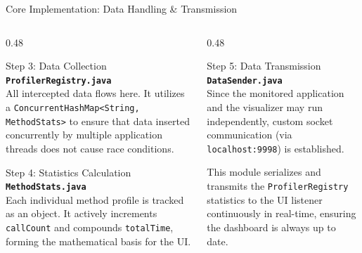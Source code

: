 \documentclass[aspectratio=169]{beamer}
\begin{document}
\begin{frame}{Core Implementation: Data Handling \& Transmission}
    \begin{columns}[T]
        \begin{column}{0.48\textwidth}
            \begin{exampleblock}{Step 3: Data Collection}
                \small \textbf{\texttt{ProfilerRegistry.java}}\\
                All intercepted data flows here. It utilizes a \texttt{ConcurrentHashMap<String, MethodStats>} to ensure that data inserted concurrently by multiple application threads does not cause race conditions.
            \end{exampleblock}
            
            \begin{exampleblock}{Step 4: Statistics Calculation}
                \small \textbf{\texttt{MethodStats.java}}\\
                Each individual method profile is tracked as an object. It actively increments \texttt{callCount} and compounds \texttt{totalTime}, forming the mathematical basis for the UI.
            \end{exampleblock}
        \end{column}

        \begin{column}{0.48\textwidth}
            \begin{alertblock}{Step 5: Data Transmission}
                \small \textbf{\texttt{DataSender.java}}\\
                Since the monitored application and the visualizer may run independently, custom socket communication (via \texttt{localhost:9998}) is established. 
                
                \vspace{0.2cm}
                This module serializes and transmits the \texttt{ProfilerRegistry} statistics to the UI listener continuously in real-time, ensuring the dashboard is always up to date.
            \end{alertblock}
        \end{column}
    \end{columns}
\end{frame}
\end{document}
